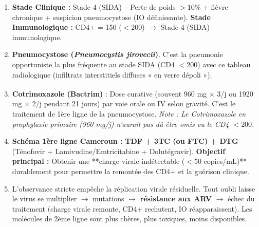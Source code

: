 \documentclass[11pt]{article}
\begin{document}
\begin{corrige}
\begin{enumerate}
    \item \textbf{Stade Clinique :} Stade 4 (SIDA) -- Perte de poids $> 10\%$ + fièvre chronique + suspicion pneumocystose (IO définissante). \textbf{Stade Immunologique :} CD4+ = 150 ($< 200$) $\rightarrow$ Stade 4 (SIDA) immunologique.
    \item \textbf{Pneumocystose (\emph{Pneumocystis jirovecii})}. C'est la pneumonie opportuniste la plus fréquente au stade SIDA (CD4 $< 200$) avec ce tableau radiologique (infiltrats interstitiels diffuses « en verre dépoli »).
    \item \textbf{Cotrimoxazole (Bactrim\textsuperscript{\textregistered})} : Dose curative (souvent 960 mg $\times$ 3/j ou 1920 mg $\times$ 2/j pendant 21 jours) par voie orale ou IV selon gravité. C'est le traitement de 1ère ligne de la pneumocystose. \textit{Note : Le Cotrimoxazole en prophylaxie primaire (960 mg/j) n'aurait pas dû être omis vu le CD4 $< 200$}.
    \item \textbf{Schéma 1ère ligne Cameroun :} \textbf{TDF + 3TC (ou FTC) + DTG} (Ténofovir + Lamivudine/Emtricitabine + Dolutégravir). \textbf{Objectif principal :} Obtenir une **charge virale indétectable ($< 50$ copies/mL)** durablement pour permettre la remontée des CD4+ et la guérison clinique.
    \item L'observance stricte empêche la réplication virale résiduelle. Tout oubli laisse le virus se multiplier $\rightarrow$ mutations $\rightarrow$ \textbf{résistance aux ARV} $\rightarrow$ échec du traitement (charge virale remonte, CD4+ rechutent, IO réapparaissent). Les molécules de 2ème ligne sont plus chères, plus toxiques, moins disponibles.
\end{enumerate}
\end{corrige}
\end{document}
